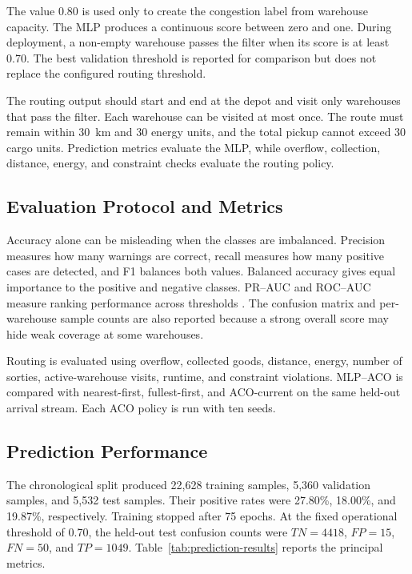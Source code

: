 \documentclass[10pt]{article}
\begin{document}
The value 0.80 is used only to create the congestion label from warehouse capacity. The MLP produces a continuous score between zero and one. During deployment, a non-empty warehouse passes the filter when its score is at least 0.70. The best validation threshold is reported for comparison but does not replace the configured routing threshold.

The routing output should start and end at the depot and visit only warehouses that pass the filter. Each warehouse can be visited at most once. The route must remain within 30~km and 30 energy units, and the total pickup cannot exceed 30 cargo units. Prediction metrics evaluate the MLP, while overflow, collection, distance, energy, and constraint checks evaluate the routing policy.

\subsection{Evaluation Protocol and Metrics}

Accuracy alone can be misleading when the classes are imbalanced. Precision measures how many warnings are correct, recall measures how many positive cases are detected, and F1 balances both values. Balanced accuracy gives equal importance to the positive and negative classes. PR--AUC and ROC--AUC measure ranking performance across thresholds \citep{saito2015}. The confusion matrix and per-warehouse sample counts are also reported because a strong overall score may hide weak coverage at some warehouses.

Routing is evaluated using overflow, collected goods, distance, energy, number of sorties, active-warehouse visits, runtime, and constraint violations. MLP--ACO is compared with nearest-first, fullest-first, and ACO-current on the same held-out arrival stream. Each ACO policy is run with ten seeds.

\subsection{Prediction Performance}

The chronological split produced 22,628 training samples, 5,360 validation samples, and 5,532 test samples. Their positive rates were 27.80\%, 18.00\%, and 19.87\%, respectively. Training stopped after 75 epochs. At the fixed operational threshold of 0.70, the held-out test confusion counts were $TN=4418$, $FP=15$, $FN=50$, and $TP=1049$. Table~\ref{tab:prediction-results} reports the principal metrics.
\end{document}
